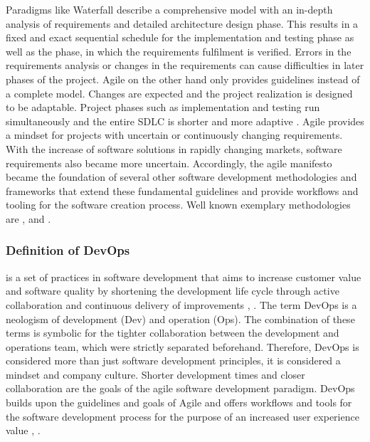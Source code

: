         \noindent Paradigms like Waterfall describe a comprehensive model with an in-depth analysis of requirements and detailed architecture design phase. This results in a fixed and exact sequential schedule for the implementation and testing phase as well as the phase, in which the requirements fulfilment is verified. Errors in the requirements analysis or changes in the requirements can cause difficulties in later phases of the project. Agile on the other hand only provides guidelines instead of a complete model. Changes are expected and the project realization is designed to be adaptable. Project phases such as implementation and testing run simultaneously and the entire \ac{SDLC} is shorter and more adaptive \cite{agile_practice}.\newline
        Agile provides a mindset for projects with uncertain or continuously changing requirements. With the increase of software solutions in rapidly changing markets, software requirements also became more uncertain. Accordingly, the agile manifesto became the foundation of several other software development methodologies and frameworks that extend these fundamental guidelines and provide workflows and tooling for the software creation process. Well known exemplary methodologies are ,  and .

        \subsubsection{Definition of DevOps}
         is a set of practices in software development that aims to increase customer value and software quality by shortening the development life cycle through active collaboration and continuous delivery of improvements \cite{base_devops}, \cite{effective_devops}. The term DevOps is a neologism of development (Dev) and operation (Ops). The combination of these terms is symbolic for the tighter collaboration between the development and operations team, which were strictly separated beforehand. Therefore, DevOps is considered more than just software development principles, it is considered a mindset and company culture. Shorter development times and closer collaboration are the goals of the agile software development paradigm. DevOps builds upon the guidelines and goals of Agile and offers workflows and tools for the software development process for the purpose of an increased user experience value \cite{azuredevops}, \cite{effective_devops}.

